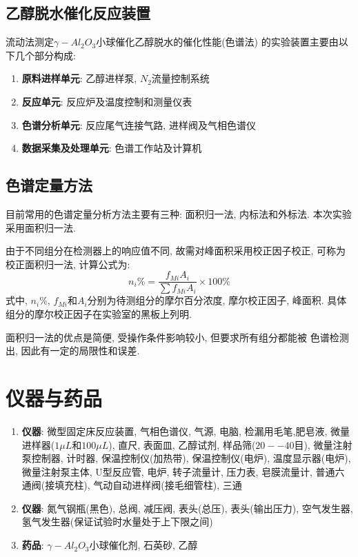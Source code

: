 \documentclass[a4paper]{article}
\begin{document}
\subsection{乙醇脱水催化反应装置}
流动法测定$\gamma-Al_2O_3$小球催化乙醇脱水的催化性能(色谱法)
的实验装置主要由以下几个部分构成:
\begin{enumerate}
\item \textbf{原料进样单元}: 乙醇进样泵, $N_{2}$流量控制系统
\item \textbf{反应单元}: 反应炉及温度控制和测量仪表
\item \textbf{色谱分析单元}: 反应尾气连接气路, 进样阀及气相色谱仪
\item \textbf{数据采集及处理单元}: 色谱工作站及计算机
\end{enumerate}
\subsection{色谱定量方法}
目前常用的色谱定量分析方法主要有三种: 面积归一法, 内标法和外标法.
本次实验采用面积归一法.
\par
由于不同组分在检测器上的响应值不同, 故需对峰面积采用校正因子校正, 
可称为校正面积归一法, 计算公式为:
\begin{equation}
n_{i}\% = \frac{f_{Mi}A_{i}}{\sum f_{Mi}A_{i}}\times 100\%
\end{equation}
式中, $n_{i}\%$, $f_{Mi}$和$A_{i}$分别为待测组分的摩尔百分浓度, 
摩尔校正因子, 峰面积. 具体组分的摩尔校正因子在实验室的黑板上列明.
\par
面积归一法的优点是简便, 受操作条件影响较小, 但要求所有组分都能被
色谱检测出, 因此有一定的局限性和误差.
\section{仪器与药品}
\begin{enumerate}
    \item \textbf{仪器}: 微型固定床反应装置, 气相色谱仪, 气源, 电脑,
	检漏用毛笔,肥皂液, 微量进样器($1\mu L$和$100\mu L$), 直尺, 表面皿, 
	乙醇试剂, 样品筛($20 -- 40$目), 微量注射泵控制器, 计时器,
	保温控制仪(加热带), 保温控制仪(电炉), 温度显示器(电炉), 微量注射泵主体, 
	U型反应管, 电炉, 转子流量计, 压力表, 皂膜流量计, 普通六通阀(接填充柱), 
	气动自动进样阀(接毛细管柱), 三通
	\item \textbf{仪器}: 氮气钢瓶(黑色), 总阀, 减压阀, 表头(总压), 表头(输出压力),
	空气发生器, 氢气发生器(保证试验时水量处于上下限之间)
    \item \textbf{药品}: $\gamma-Al_2O_3$小球催化剂, 石英砂, 乙醇
\end{enumerate}
\end{document}
